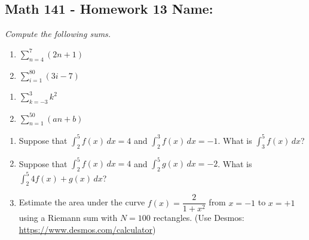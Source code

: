 \documentclass[11pt]{article}
\newcommand{\ds}{\displaystyle}
\begin{document}
\pagestyle{empty}
\subsection*{Math 141 - Homework 13 \hfill Name: \underline{\hspace*{2in}}}


\textit{Compute the following sums.}
\begin{multicols}{2}
\begin{enumerate}
\item $\ds \sum_{n = 4}^7 (2n + 1)$
\item $\ds \sum_{i = 1}^{80} (3i - 7)$
\setcounter{enumCount}{\theenumi}
\end{enumerate}
\end{multicols}
\vfill


\begin{multicols}{2}
\begin{enumerate}
\setcounter{enumi}{\theenumCount}
\item $\ds \sum_{k = -3}^{3} k^2$
\item $\ds \sum_{n=1}^{50} (an+b)$
\setcounter{enumCount}{\theenumi}
\end{enumerate}
\end{multicols}
\vfill



\begin{enumerate}
\setcounter{enumi}{\theenumCount}
\item Suppose that $\ds \int_2^5 f(x) \, dx = 4$ and $\ds \int_2^3 f(x) \, dx = -1$.  What is $\ds \int_3^5 f(x) \, dx$?
\vfill
\item Suppose that $\ds \int_2^5 f(x) \, dx = 4$ and $\ds \int_2^5 g(x) \, dx = -2$.  What is $\ds \int_2^5 4f(x) + g(x) \, dx$?
\vfill

\item Estimate the area under the curve $f(x) = \dfrac{2}{1+x^2}$ from $x = -1$ to $x = +1$ using a Riemann sum with $N=100$ rectangles. (Use Desmos: \url{https://www.desmos.com/calculator})
\vfill

\setcounter{enumCount}{\theenumi}
\end{enumerate}
\end{document}
